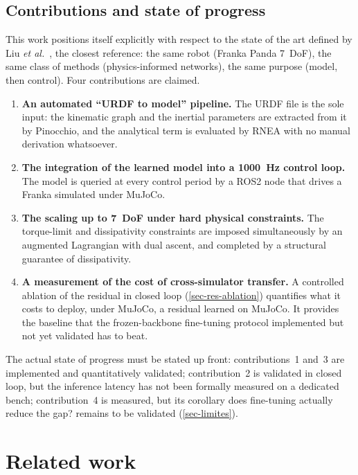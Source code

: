 \documentclass[a4paper, oneside]{article}
\begin{document}
\subsection{Contributions and state of progress}
\label{sec-contributions}

This work positions itself explicitly with respect to the state of the art
defined by Liu \emph{et al.}~\cite{liu2024}, the closest reference: the same
robot (Franka Panda 7~DoF), the same class of methods (physics-informed
networks), the same purpose (model, then control). Four contributions are
claimed.

\begin{enumerate}
    \item \textbf{An automated ``URDF to model'' pipeline.} The URDF file is the
    sole input: the kinematic graph and the inertial parameters are extracted
    from it by Pinocchio, and the analytical term is evaluated by RNEA with no
    manual derivation whatsoever.
    \item \textbf{The integration of the learned model into a
    \SI{1000}{\hertz} control loop.} The model is queried at every control
    period by a ROS2 node that drives a Franka simulated under MuJoCo.
    \item \textbf{The scaling up to 7~DoF under hard physical constraints.} The
    torque-limit and dissipativity constraints are imposed simultaneously by an
    augmented Lagrangian with dual ascent, and completed by a structural
    guarantee of dissipativity.
    \item \textbf{A measurement of the cost of cross-simulator transfer.} A
    controlled ablation of the residual in closed loop
    (\cref{sec-res-ablation}) quantifies what it costs to deploy, under MuJoCo,
    a residual learned on MuJoCo. It provides the baseline that the
    frozen-backbone fine-tuning protocol  implemented but not yet validated
     has to beat.
\end{enumerate}

The actual state of progress must be stated up front: contributions~1 and~3 are
implemented and quantitatively validated; contribution~2 is validated in closed
loop, but the inference latency has not been formally measured on a dedicated
bench; contribution~4 is measured, but its corollary  does fine-tuning
actually reduce the gap?  remains to be validated (\cref{sec-limites}).

\section{Related work}
\label{sec-etat-art}
\end{document}
